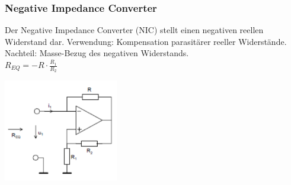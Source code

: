        	 \begin{minipage}[c]{12cm}
       	 \subsubsection{Negative Impedance Converter}
       	 	Der Negative Impedance Converter (NIC) stellt einen negativen reellen Widerstand
       	 	dar. Verwendung: Kompensation parasitärer reeller Widerstände. \\
       	 	Nachteil: Masse-Bezug des negativen Widerstands. \bigskip \\
       	 	$R_{EQ}=-R \cdot \frac{R_1}{R_2}$\\
       	 \end{minipage}
       	 \begin{minipage}[c]{5cm}
       	 	\includegraphics[width=5cm]{./images/neg-imp-conv.png}
       	 \end{minipage}

